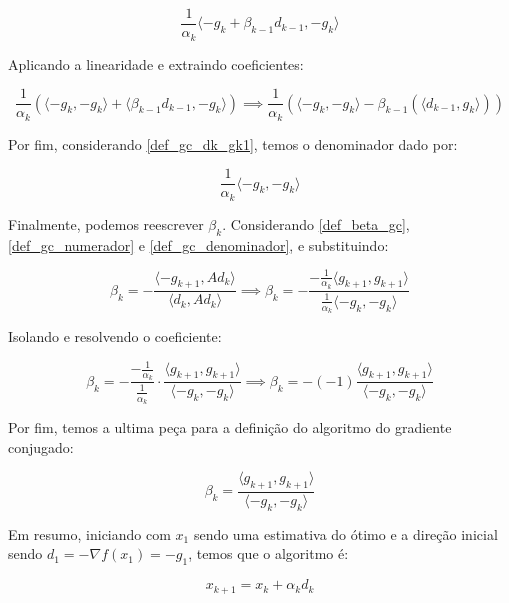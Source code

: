 \begin{equation}
\frac{1}{\alpha_k} \langle -g_{k} + \beta_{k-1} d_{k-1}, - g_k \rangle
\end{equation}

Aplicando a linearidade e extraindo coeficientes:


\begin{equation}
\frac{1}{\alpha_k}(
\langle -g_{k}, - g_k \rangle +
\langle \beta_{k-1} d_{k-1}, - g_k \rangle
) \implies
\frac{1}{\alpha_k}(
\langle -g_{k}, - g_k \rangle -
\beta_{k-1}(\langle d_{k-1}, g_k \rangle)
)
\end{equation}

Por fim, considerando \ref{def_gc_dk_gk1}, temos o denominador dado por:

\begin{equation}
\label{def_gc_denominador}
\frac{1}{\alpha_k} \langle -g_{k}, - g_k \rangle
\end{equation}


Finalmente, podemos reescrever \(\beta_k\). Considerando \ref{def_beta_gc}, \ref{def_gc_numerador} e \ref{def_gc_denominador}, e substituindo:

\begin{equation}
\beta_k = - \frac{\langle -g_{k+1}, Ad_k \rangle}{\langle d_k, Ad_k \rangle} \implies \beta_k = - \frac{-\frac{1}{\alpha_k} \langle g_{k+1}, g_{k+1} \rangle}{\frac{1}{\alpha_k} \langle -g_{k}, - g_k \rangle}
\end{equation}

Isolando e resolvendo o coeficiente:

\begin{equation}
  \beta_k = - \frac{-\frac{1}{\alpha_k}}{\frac{1}{\alpha_k}} \cdot \frac{\langle g_{k+1}, g_{k+1} \rangle}{\langle -g_{k}, - g_k \rangle}   \implies \beta_k = - (-1) \frac{\langle g_{k+1}, g_{k+1} \rangle}{\langle -g_{k}, - g_k \rangle}
\end{equation}

Por fim, temos a ultima peça para a definição do algoritmo do gradiente conjugado:

\begin{equation}
\beta_k = \frac{\langle g_{k+1}, g_{k+1} \rangle}{\langle -g_{k}, - g_k \rangle}
\end{equation}

Em resumo, iniciando com \(x_1\) sendo uma estimativa do ótimo e a direção inicial sendo \(d_1 = -\nabla f(x_1) = -g_1\), temos que o algoritmo é:

\begin{equation}
x_{k+1} = x_k + \alpha_k d_k
\end{equation}

